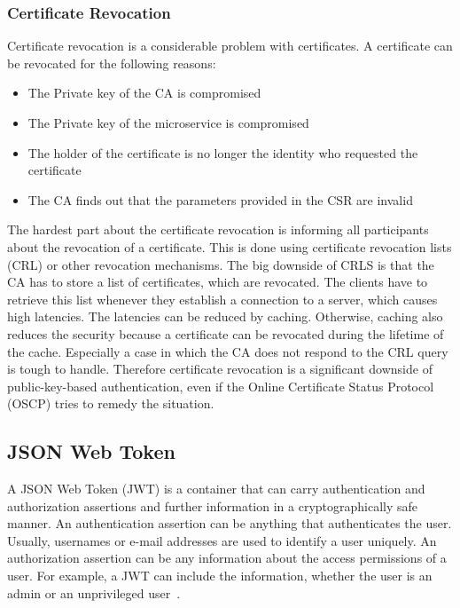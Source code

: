 \subsubsection{Certificate Revocation}
Certificate revocation is a considerable problem with certificates.
A certificate can be revocated for the following reasons: 
\begin{itemize}
    \item The Private key of the CA is compromised
    \item The Private key of the microservice is compromised
    \item The holder of the certificate is no longer the identity who requested the certificate 
    \item The CA finds out that the parameters provided in the CSR are invalid
\end{itemize}
The hardest part about the certificate revocation is informing all participants about the revocation of a certificate.
This is done using certificate revocation lists (CRL) or other revocation mechanisms.
The big downside of CRLS is that the CA has to store a list of certificates, which are revocated.
The clients have to retrieve this list whenever they establish a connection to a server, which causes high latencies.
The latencies can be reduced by caching.
Otherwise, caching also reduces the security because a certificate can be revocated during the lifetime of the cache.
Especially a case in which the CA does not respond to the CRL query is tough to handle.
Therefore certificate revocation is a significant downside of public-key-based authentication, even if the Online Certificate Status Protocol (OSCP) tries to remedy the situation\cite{dias2020microservices}.

\subsection{JSON Web Token}
A JSON Web Token (JWT) is a container that can carry authentication and authorization assertions and further information in a cryptographically safe manner.
An authentication assertion can be anything that authenticates the user.
Usually, usernames or e-mail addresses are used to identify a user uniquely.
An authorization assertion can be any information about the access permissions of a user.
For example, a JWT can include the information, whether the user is an admin or an unprivileged user~\cite{dias2020microservices}. 

